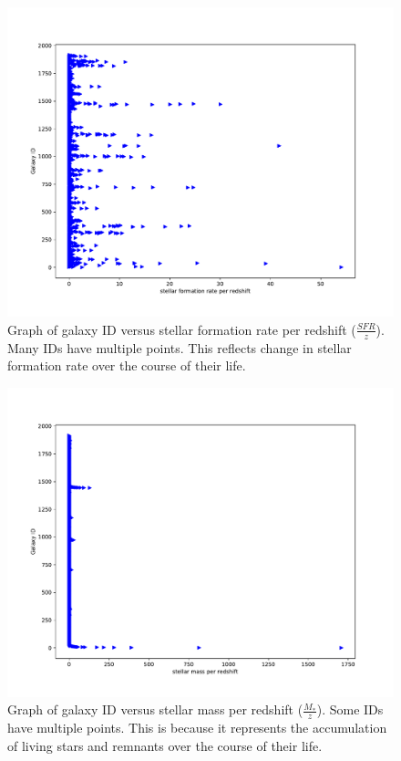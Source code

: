 \documentclass{article}
\begin{document}
\begin{figure}
  \includegraphics[width=\linewidth]{stellar formation rate per redshift.pdf}
  \caption{Graph of galaxy ID versus stellar formation rate per redshift ($\frac{SFR}{z}$). Many IDs have multiple points. This reflects change in stellar formation rate over the course of their life.}
  \label{fig:sfr_per_z}
\end{figure}

\begin{figure}
  \includegraphics[width=\linewidth]{stellar mass per redshift.pdf}
  \caption{Graph of galaxy ID versus stellar mass per redshift ($\frac{M_*}{z}$). Some IDs have multiple points. This is because it represents the accumulation of living stars and remnants over the course of their life.}
  \label{fig:stellarmass_per_z}
\end{figure}
\end{document}
